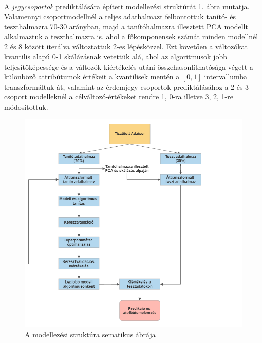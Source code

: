 \documentclass[12pt]{article}
\begin{document}
A \textit{jegycsoportok} prediktálására épített modellezési struktúrát \ref{fig:modell}. ábra mutatja. Valamennyi csoportmodellnél a teljes adathalmazt felbontottuk tanító- és teszthalmazra 70-30 arányban, majd a tanítóhalmazra illesztett PCA modellt alkalmaztuk a teszthalmazra is, ahol a főkomponensek számát minden modellnél 2 és 8 között iterálva változtattuk 2-es lépésközzel. Ezt követően a változókat kvantilis alapú 0-1 skálázásnak vetettük alá, ahol az algoritmusok jobb teljesítőképessége és a változók kiértékelés utáni összehasonlíthatósága végett a különböző attribútumok értékeit a kvantilisek mentén a $[0, 1]$ intervallumba transzformáltuk át, valamint az érdemjegy csoportok prediktálásához a 2 és 3 csoport modelleknél a célváltozó-értékeket rendre 1, 0-ra illetve 3, 2, 1-re módosítottuk. 

\begin{figure}
\centering
\includegraphics[scale=0.6]{kepek/flowchart.png}
\caption{A modellezési struktúra sematikus ábrája}
\label{fig:modell}
\end{figure}
\end{document}
